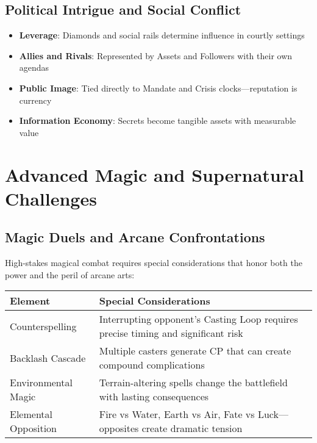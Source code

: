 \subsection*{Political Intrigue and Social Conflict}

\begin{itemize}
    \item \textbf{Leverage}: Diamonds and social rails determine influence in courtly settings
    \item \textbf{Allies and Rivals}: Represented by Assets and Followers with their own agendas
    \item \textbf{Public Image}: Tied directly to Mandate and Crisis clocks—reputation is currency
    \item \textbf{Information Economy}: Secrets become tangible assets with measurable value
\end{itemize}

\section*{Advanced Magic and Supernatural Challenges}

\subsection*{Magic Duels and Arcane Confrontations}

High-stakes magical combat requires special considerations that honor both the power and the peril of arcane arts:

\begin{fatebox}
\begin{tabularx}{\textwidth}{lX}
\toprule
\textbf{Element} & \textbf{Special Considerations} \\
\midrule
Counterspelling & Interrupting opponent's Casting Loop requires precise timing and significant risk \\
Backlash Cascade & Multiple casters generate CP that can create compound complications \\
Environmental Magic & Terrain-altering spells change the battlefield with lasting consequences \\
Elemental Opposition & Fire vs Water, Earth vs Air, Fate vs Luck—opposites create dramatic tension \\
\bottomrule
\end{tabularx}
\end{fatebox}

